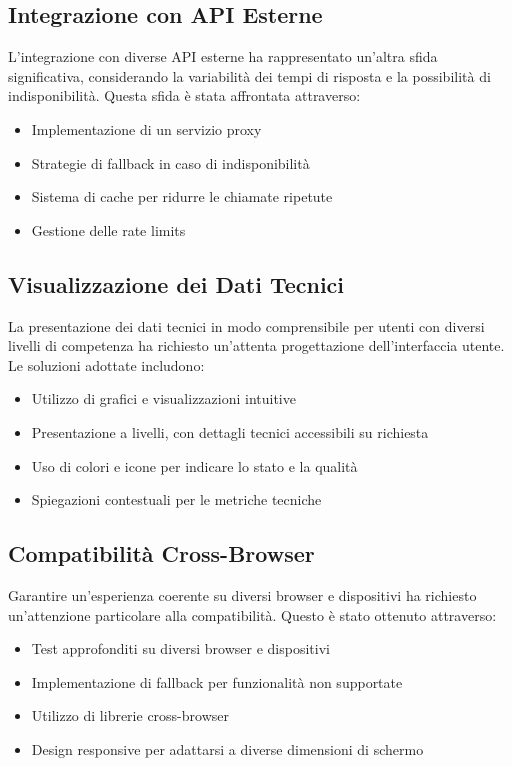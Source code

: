 \subsection{Integrazione con API Esterne}
L'integrazione con diverse API esterne ha rappresentato un'altra sfida significativa, considerando la variabilità dei tempi di risposta e la possibilità di indisponibilità. Questa sfida è stata affrontata attraverso:

\begin{itemize}
    \item Implementazione di un servizio proxy
    \item Strategie di fallback in caso di indisponibilità
    \item Sistema di cache per ridurre le chiamate ripetute
    \item Gestione delle rate limits
\end{itemize}

\subsection{Visualizzazione dei Dati Tecnici}
La presentazione dei dati tecnici in modo comprensibile per utenti con diversi livelli di competenza ha richiesto un'attenta progettazione dell'interfaccia utente. Le soluzioni adottate includono:

\begin{itemize}
    \item Utilizzo di grafici e visualizzazioni intuitive
    \item Presentazione a livelli, con dettagli tecnici accessibili su richiesta
    \item Uso di colori e icone per indicare lo stato e la qualità
    \item Spiegazioni contestuali per le metriche tecniche
\end{itemize}

\subsection{Compatibilità Cross-Browser}
Garantire un'esperienza coerente su diversi browser e dispositivi ha richiesto un'attenzione particolare alla compatibilità. Questo è stato ottenuto attraverso:

\begin{itemize}
    \item Test approfonditi su diversi browser e dispositivi
    \item Implementazione di fallback per funzionalità non supportate
    \item Utilizzo di librerie cross-browser
    \item Design responsive per adattarsi a diverse dimensioni di schermo
\end{itemize}

